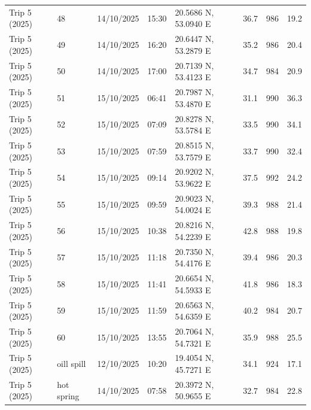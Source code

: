 \begin{scriptsize}
\begin{longtable}{llllllll}
Trip 5 (2025) & 48 & 14/10/2025 & 15:30 & 20.5686 N, 53.0940 E & 36.7 & 986 & 19.2 \\
Trip 5 (2025) & 49 & 14/10/2025 & 16:20 & 20.6447 N, 53.2879 E & 35.2 & 986 & 20.4 \\
Trip 5 (2025) & 50 & 14/10/2025 & 17:00 & 20.7139 N, 53.4123 E & 34.7 & 984 & 20.9 \\
Trip 5 (2025) & 51 & 15/10/2025 & 06:41 & 20.7987 N, 53.4870 E & 31.1 & 990 & 36.3 \\
Trip 5 (2025) & 52 & 15/10/2025 & 07:09 & 20.8278 N, 53.5784 E & 33.5 & 990 & 34.1 \\
Trip 5 (2025) & 53 & 15/10/2025 & 07:59 & 20.8515 N, 53.7579 E & 33.7 & 990 & 32.4 \\
Trip 5 (2025) & 54 & 15/10/2025 & 09:14 & 20.9202 N, 53.9622 E & 37.5 & 992 & 24.2 \\
Trip 5 (2025) & 55 & 15/10/2025 & 09:59 & 20.9023 N, 54.0024 E & 39.3 & 988 & 21.4 \\
Trip 5 (2025) & 56 & 15/10/2025 & 10:38 & 20.8216 N, 54.2239 E & 42.8 & 988 & 19.8 \\
Trip 5 (2025) & 57 & 15/10/2025 & 11:18 & 20.7350 N, 54.4176 E & 39.4 & 986 & 20.3 \\
Trip 5 (2025) & 58 & 15/10/2025 & 11:41 & 20.6654 N, 54.5933 E & 41.8 & 986 & 18.3 \\
Trip 5 (2025) & 59 & 15/10/2025 & 11:59 & 20.6563 N, 54.6359 E & 40.2 & 984 & 20.7 \\
Trip 5 (2025) & 60 & 15/10/2025 & 13:55 & 20.7064 N, 54.7321 E & 35.9 & 988 & 25.5 \\
Trip 5 (2025) & oill spill & 12/10/2025 & 10:20 & 19.4054 N, 45.7271 E & 34.1 & 924 & 17.1 \\
Trip 5 (2025) & hot spring & 14/10/2025 & 07:58 & 20.3972 N, 50.9655 E & 32.7 & 984 & 22.8 \\
\end{longtable}
\end{scriptsize}
